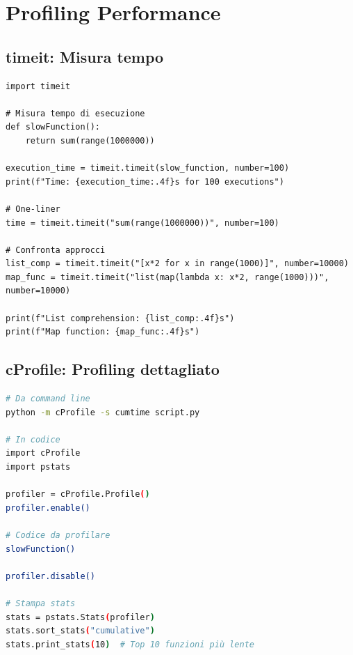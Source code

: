 \section{Profiling Performance}

\subsection{timeit: Misura tempo}

\begin{lstlisting}
import timeit

# Misura tempo di esecuzione
def slowFunction():
    return sum(range(1000000))

execution_time = timeit.timeit(slow_function, number=100)
print(f"Time: {execution_time:.4f}s for 100 executions")

# One-liner
time = timeit.timeit("sum(range(1000000))", number=100)

# Confronta approcci
list_comp = timeit.timeit("[x*2 for x in range(1000)]", number=10000)
map_func = timeit.timeit("list(map(lambda x: x*2, range(1000)))", number=10000)

print(f"List comprehension: {list_comp:.4f}s")
print(f"Map function: {map_func:.4f}s")
\end{lstlisting}

\subsection{cProfile: Profiling dettagliato}

\begin{lstlisting}[language=bash]
# Da command line
python -m cProfile -s cumtime script.py

# In codice
import cProfile
import pstats

profiler = cProfile.Profile()
profiler.enable()

# Codice da profilare
slowFunction()

profiler.disable()

# Stampa stats
stats = pstats.Stats(profiler)
stats.sort_stats("cumulative")
stats.print_stats(10)  # Top 10 funzioni più lente
\end{lstlisting}

